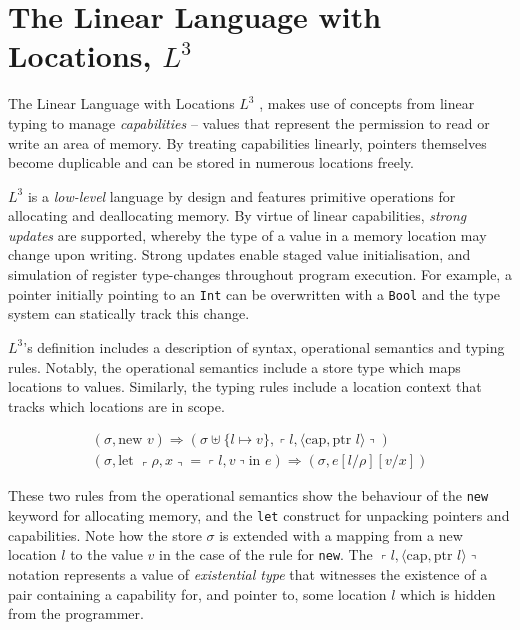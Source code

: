 \documentclass[]{unswthesis}
\newcommand{\lquine}{\left\ulcorner}
\newcommand{\rquine}{\right\urcorner}
\newcommand{\capa}{\text{cap}}
\newcommand{\ptr}{\text{ptr }}
\let\c\texttt
\let\i\textit
\begin{document}
\section{The Linear Language with Locations, $L^3$}


The Linear Language with Locations $L^3$ \cite{ahmed05}, makes use of concepts from linear typing to manage \i{capabilities} -- values that represent the permission to read or write an area of memory. By treating capabilities linearly, pointers themselves become duplicable and can be stored in numerous locations freely.

$L^3$ is a \i{low-level} language by design and features primitive operations for allocating and deallocating memory. By virtue of linear capabilities, \i{strong updates} are supported, whereby the type of a value in a memory location may change upon writing. Strong updates enable staged value initialisation, and simulation of register type-changes throughout program execution. For example, a pointer initially pointing to an \c{Int} can be overwritten with a \c{Bool} and the type system can statically track this change.

$L^3$'s definition includes a description of syntax, operational semantics and typing rules. Notably, the operational semantics include a store type which maps locations to values. Similarly, the typing rules include a location context that tracks which locations are in scope.

\begin{eqnarray*}
(\sigma, \text{new } v) \Rightarrow (\sigma \uplus \{l \mapsto v\},
	\lquine l, \langle \capa, \ptr l \rangle \rquine)
\\
(\sigma, \text{let } \lquine \rho, x \rquine = \lquine l, v \rquine \text{in } e)
	\Rightarrow
	(\sigma, e[l/\rho][v/x])
\end{eqnarray*}

These two rules from the operational semantics show the behaviour of the \c{new} keyword for allocating memory, and the \c{let} construct for unpacking pointers and capabilities. Note how the store $\sigma$ is extended with a mapping from a new location $l$ to the value $v$ in the case of the rule for \c{new}. The $\lquine l, \langle \capa, \ptr l \rangle \rquine$ notation represents a value of \i{existential type} that witnesses the existence of a pair containing a capability for, and pointer to, some location $l$ which is hidden from the programmer.
\end{document}
